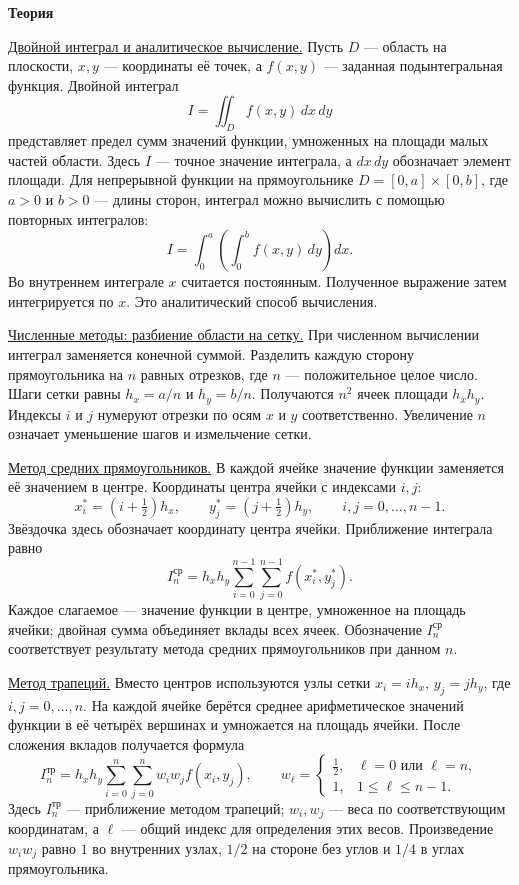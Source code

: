 \documentclass[12pt,a4paper]{article}
\newcommand{\taskhead}[1]{\par\textbf{#1}\par}
\begin{document}
\taskhead{Теория}
\underline{Двойной интеграл и аналитическое вычисление.}
Пусть $D$ --- область на плоскости, $x,y$ --- координаты её точек,
а $f(x,y)$ --- заданная подынтегральная функция. Двойной интеграл
\[
I=\iint_D f(x,y)\,dx\,dy
\]
представляет предел сумм значений функции, умноженных на площади малых частей
области. Здесь $I$ --- точное значение интеграла, а $dx\,dy$ обозначает элемент площади.
Для непрерывной функции на прямоугольнике $D=[0,a]\times[0,b]$, где
$a>0$ и $b>0$ --- длины сторон, интеграл можно вычислить с помощью повторных интегралов:
\[
I=\int_0^a\left(\int_0^b f(x,y)\,dy\right)dx.
\]
Во внутреннем интеграле $x$ считается постоянным. Полученное выражение
затем интегрируется по $x$. Это аналитический способ вычисления.

\underline{Численные методы: разбиение области на сетку.}
При численном вычислении интеграл заменяется конечной суммой.
Разделить каждую сторону прямоугольника на $n$ равных отрезков,
где $n$ --- положительное целое число. Шаги сетки равны
$h_x=a/n$ и $h_y=b/n$. Получаются $n^2$ ячеек площади $h_xh_y$.
Индексы $i$ и $j$ нумеруют отрезки по осям $x$ и $y$ соответственно.
Увеличение $n$ означает уменьшение шагов и измельчение сетки.

\underline{Метод средних прямоугольников.}
В каждой ячейке значение функции заменяется её значением в центре.
Координаты центра ячейки с индексами $i,j$:
\[
x_i^*=(i+\tfrac12)h_x,\qquad y_j^*=(j+\tfrac12)h_y,
\qquad i,j=0,\ldots,n-1.
\]
Звёздочка здесь обозначает координату центра ячейки. Приближение интеграла равно
\[
I_n^{\mathrm{ср}}=h_xh_y\sum_{i=0}^{n-1}\sum_{j=0}^{n-1}f(x_i^*,y_j^*).
\]
Каждое слагаемое --- значение функции в центре, умноженное на площадь ячейки;
двойная сумма объединяет вклады всех ячеек. Обозначение $I_n^{\mathrm{ср}}$
соответствует результату метода средних прямоугольников при данном $n$.

\underline{Метод трапеций.}
Вместо центров используются узлы сетки $x_i=ih_x$, $y_j=jh_y$,
где $i,j=0,\ldots,n$. На каждой ячейке берётся среднее арифметическое
значений функции в её четырёх вершинах и умножается на площадь ячейки.
После сложения вкладов получается формула
\[
I_n^{\mathrm{тр}}=h_xh_y\sum_{i=0}^{n}\sum_{j=0}^{n}w_iw_j f(x_i,y_j),
\qquad
w_\ell=\begin{cases}
\tfrac12,&\ell=0\text{ или }\ell=n,\\
1,&1\leq\ell\leq n-1.
\end{cases}
\]
Здесь $I_n^{\mathrm{тр}}$ --- приближение методом трапеций;
$w_i,w_j$ --- веса по соответствующим координатам, а $\ell$ --- общий индекс
для определения этих весов. Произведение $w_iw_j$ равно $1$ во внутренних
узлах, $1/2$ на стороне без углов и $1/4$ в углах прямоугольника.
\end{document}
